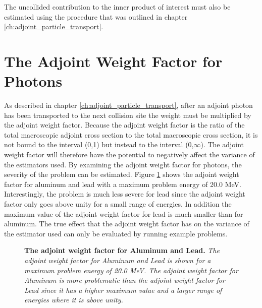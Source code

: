 The uncollided contribution to the inner product of interest must
also be estimated using the procedure that was outlined in chapter 
\ref{ch:adjoint_particle_transport}. 

\section{The Adjoint Weight Factor for Photons}
As described in chapter \ref{ch:adjoint_particle_transport}, after an adjoint
photon has been transported to the next collision site the weight must be 
multiplied by the adjoint weight factor. Because the adjoint weight factor
is the ratio of the total macroscopic adjoint cross section to the total
macroscopic cross section, it is not bound to the interval (0,1) but instead
to the interval (0,$\infty$). The adjoint weight factor will therefore have the
potential to negatively affect the variance of the estimators used. By examining
the adjoint weight factor for photons, the severity of the problem can be 
estimated. Figure \ref{fig:adjoint_weight_factor} shows the adjoint weight 
factor for aluminum and lead with a maximum problem energy of 20.0 MeV. 
Interestingly, the problem is much less severe for lead since the adjoint 
weight factor only goes above unity for a small range of energies. In addition
the maximum value of the adjoint weight factor for lead is much smaller than
for aluminum. The true effect that the adjoint weight factor has on the 
variance of the estimator used can only be evaluated by running example 
problems.
\begin{figure}[t!]
  \begin{center}
  \end{center}
  \caption{\textbf{The adjoint weight factor for Aluminum and Lead.}
    \textit{The adjoint weight factor for Aluminum and Lead is shown for a
      maximum problem energy of 20.0 MeV. The adjoint weight factor for 
      Aluminum is more problematic than the adjoint weight factor for Lead
      since it has a higher maximum value and a larger range of energies where
      it is above unity.}}
  \label{fig:adjoint_weight_factor}
\end{figure}
